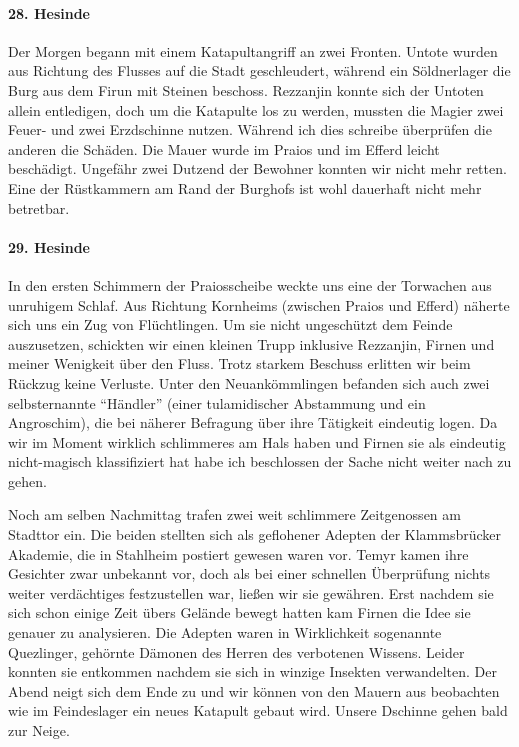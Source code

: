 \paragraph{28. Hesinde}
Der Morgen begann mit einem Katapultangriff an zwei Fronten. Untote wurden aus Richtung des Flusses auf die Stadt geschleudert, während ein Söldnerlager die Burg aus dem Firun mit Steinen beschoss. Rezzanjin konnte sich der Untoten allein entledigen, doch um die Katapulte los zu werden, mussten die Magier zwei Feuer- und zwei Erzdschinne nutzen. Während ich dies schreibe überprüfen die anderen die Schäden. Die Mauer wurde im Praios und im Efferd leicht beschädigt. Ungefähr zwei Dutzend der Bewohner konnten wir nicht mehr retten. Eine der Rüstkammern am Rand der Burghofs ist wohl dauerhaft nicht mehr betretbar.

\paragraph{29. Hesinde}
In den ersten Schimmern der Praiosscheibe weckte uns eine der Torwachen aus unruhigem Schlaf. Aus Richtung Kornheims (zwischen Praios und Efferd) näherte sich uns ein Zug von Flüchtlingen. Um sie nicht ungeschützt dem Feinde auszusetzen, schickten wir einen kleinen Trupp inklusive Rezzanjin, Firnen und meiner Wenigkeit über den Fluss. Trotz starkem Beschuss erlitten wir beim Rückzug keine Verluste. Unter den Neuankömmlingen befanden sich auch zwei selbsternannte ``Händler'' (einer tulamidischer Abstammung und ein Angroschim), die bei näherer Befragung über ihre Tätigkeit eindeutig logen. Da wir im Moment wirklich schlimmeres am Hals haben und Firnen sie als eindeutig nicht-magisch klassifiziert hat habe ich beschlossen der Sache nicht weiter nach zu gehen.

Noch am selben Nachmittag trafen zwei weit schlimmere Zeitgenossen am Stadttor ein. Die beiden stellten sich als geflohener Adepten der Klammsbrücker Akademie, die in Stahlheim postiert gewesen waren vor. Temyr kamen ihre Gesichter zwar unbekannt vor, doch als bei einer schnellen Überprüfung nichts weiter verdächtiges festzustellen war, ließen wir sie gewähren. Erst nachdem sie sich schon einige Zeit übers Gelände bewegt hatten kam Firnen die Idee sie genauer zu analysieren. Die Adepten waren in Wirklichkeit sogenannte Quezlinger, gehörnte Dämonen des Herren des verbotenen Wissens. Leider konnten sie entkommen nachdem sie sich in winzige Insekten verwandelten. Der Abend neigt sich dem Ende zu und wir können von den Mauern aus beobachten wie im Feindeslager ein neues Katapult gebaut wird. Unsere Dschinne gehen bald zur Neige.

